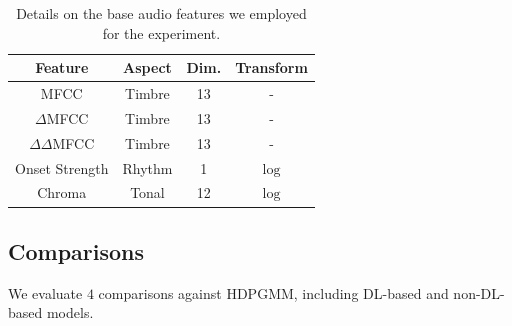 \documentclass{article}
\begin{document}
\begin{table}[h!]
\centering
\begin{tabular}{ cccc }
    \hline
    Feature       & Aspect   & Dim.   & Transform\\ 
    \hline
    \hline 
    MFCC & Timbre & 13 & -         \\ 
    $\Delta$MFCC & Timbre & 13 & -         \\ 
    $\Delta\Delta$MFCC & Timbre & 13 & -         \\ 
    Onset Strength\cite{88} & Rhythm & 1 & $\text{log}$  \\ 
    Chroma\cite{ellis_2007} & Tonal & 12 & $\text{log}$  \\ 
    \hline
\end{tabular}
\caption{Details on the base audio features we employed for the experiment.}
\label{tab:feature}
\end{table}

\subsection{Comparisons}\label{sec:experimental_setup:comparisons}

We evaluate $4$ comparisons against HDPGMM, including DL-based and non-DL-based models.
\end{document}
